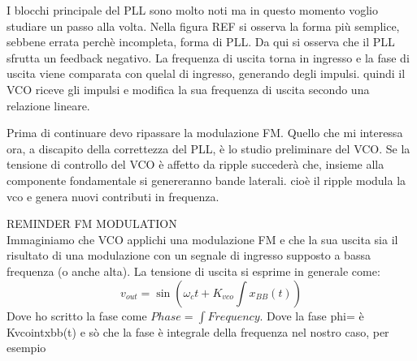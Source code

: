 {}%
{}%
%
I blocchi principale del PLL sono molto noti ma in questo momento voglio studiare un passo alla volta. 
Nella figura REF si osserva la forma più semplice, sebbene errata perchè incompleta, forma di PLL. 
Da qui si osserva che il PLL sfrutta un feedback negativo. La frequenza di uscita torna in ingresso e la fase di uscita viene comparata con quelal di ingresso, generando
degli impulsi. quindi il VCO riceve gli impulsi e modifica la sua frequenza di uscita secondo una relazione lineare.

{}%
{}%
%
Prima di continuare devo ripassare la modulazione FM.
Quello che mi interessa ora, a discapito della correttezza del PLL, è lo studio preliminare del VCO.
Se la tensione di controllo del VCO è affetto da ripple succederà che,  insieme alla componente fondamentale si 
genereranno bande laterali. cioè il ripple modula la vco e genera nuovi contributi in frequenza.

REMINDER FM MODULATION\\
Immaginiamo che VCO applichi una modulazione FM e che la sua uscita sia il risultato di una modulazione con un segnale
di ingresso supposto a bassa frequenza (o anche alta).
{}%
{}%
%
La tensione di uscita si esprime in generale come:
\begin{equation}
    v_{out}=\sin{\left(\omega_c t +K_{vco}\int x_{BB}(t)\right)}
\end{equation}
Dove ho scritto la fase come $Phase=\int Frequency$. Dove la fase phi= è Kvcointxbb(t) e sò che la fase è integrale della frequenza
nel nostro caso, per esempio

